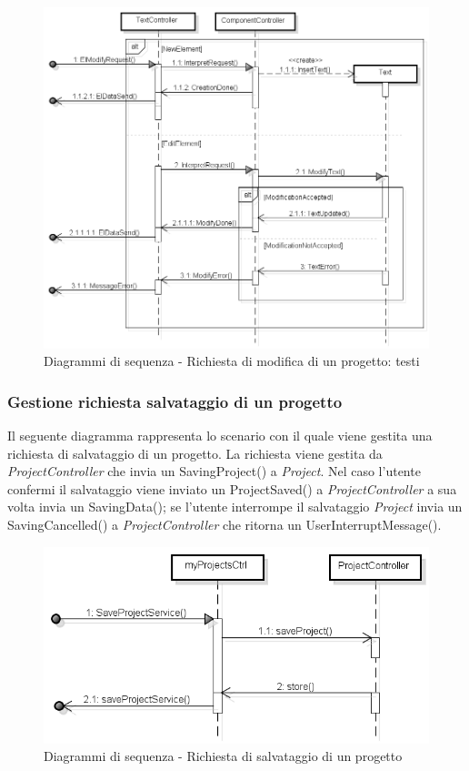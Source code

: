 \begin{figure}[h]
	\centering
	\includegraphics[scale=0.5]{img/text.png}
	\caption{Diagrammi di sequenza - Richiesta di modifica di un progetto: testi}
\end{figure}

\subsubsection{Gestione richiesta salvataggio di un progetto}
Il seguente diagramma rappresenta lo scenario con il quale viene gestita una richiesta di salvataggio di un progetto. La richiesta viene gestita da \textit{ProjectController} che invia un SavingProject() a \textit{Project}. Nel caso l'utente confermi il salvataggio viene inviato un ProjectSaved() a \textit{ProjectController} a sua volta invia un SavingData(); se l'utente interrompe il salvataggio \textit{Project} invia un SavingCancelled() a \textit{ProjectController} che ritorna un UserInterruptMessage().

\begin{figure}[H]
	\centering
	\includegraphics[scale=0.5]{img/save.png}
	\caption{Diagrammi di sequenza - Richiesta di salvataggio di un progetto}
\end{figure}
\newpage